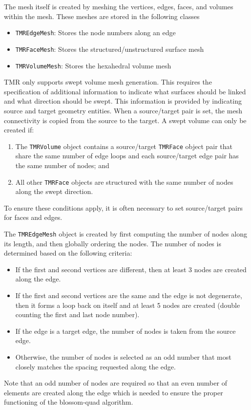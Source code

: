 \documentclass[12pt]{article}
\begin{document}
The mesh itself is created by meshing the vertices, edges, faces, and volumes within the mesh.
These meshes are stored in the following classes
%
\begin{itemize}
\item \texttt{TMREdgeMesh}: Stores the node numbers along an edge
\item \texttt{TMRFaceMesh}: Stores the structured/unstructured surface mesh
\item \texttt{TMRVolumeMesh}: Stores the hexahedral volume mesh
\end{itemize}

TMR only supports swept volume mesh generation.
This requires the specification of additional information to indicate what surfaces should be linked and what direction should be swept.
This information is provided by indicating source and target geometry entities.
When a source/target pair is set, the mesh connectivity is copied from the source to the target. 
A swept volume can only be created if:
\begin{enumerate}
\item The \texttt{TMRVolume} object contains a source/target \texttt{TMRFace} object pair that share the same number of edge loops and each source/target edge pair has the same number of nodes; and
\item All other \texttt{TMRFace} objects are structured with the same number of nodes along the swept direction.
\end{enumerate}
%
To ensure these conditions apply, it is often necessary to set source/target pairs for faces and edges.

The \texttt{TMREdgeMesh} object is created by first computing the number of nodes along its length, and then globally ordering the nodes. The number of nodes is determined based on the following criteria:
\begin{itemize}
\item If the first and second vertices are different, then at least 3 nodes are created along the edge.
\item If the first and second vertices are the same and the edge is not degenerate, then it forms a loop back on itself and at least 5 nodes are created (double counting the first and last node number).
\item If the edge is a target edge, the number of nodes is taken from the source edge.
\item Otherwise, the number of nodes is selected as an odd number that most closely matches the spacing requested along the edge.
\end{itemize}
Note that an odd number of nodes are required so that an even number of elements are created along the edge which is needed to ensure the proper functioning of the blossom-quad algorithm.
\end{document}

